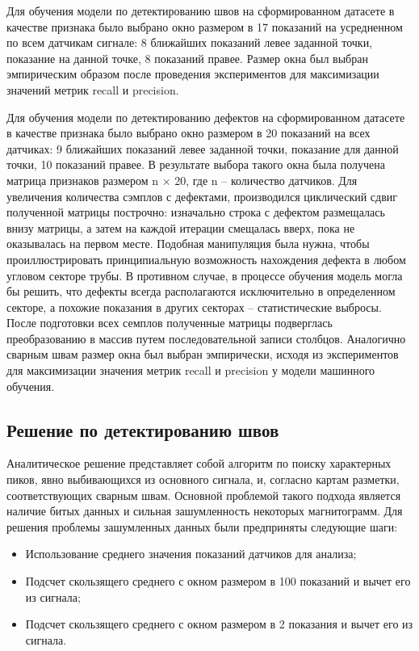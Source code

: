 \documentclass[a4paper,article,14pt]{extarticle}
\begin{document}
Для обучения модели по детектированию швов на сформированном датасете в качестве признака 
было выбрано окно размером в 17 показаний на усредненном по всем датчикам сигнале: 
8 ближайших показаний левее заданной точки, показание на данной точке, 8 показаний правее. 
Размер окна был выбран эмпирическим образом после проведения экспериментов для максимизации значений 
метрик recall и precision.

Для обучения модели по детектированию дефектов на сформированном датасете в качестве признака 
было выбрано окно размером в 20 показаний на всех датчиках: 9 ближайших показаний левее заданной точки, 
показание для данной точки, 10 показаний правее. В результате выбора такого окна была получена матрица 
признаков размером n × 20, где n – количество датчиков. Для увеличения количества сэмплов с дефектами, 
производился циклический сдвиг полученной матрицы построчно: изначально строка с дефектом размещалась \flqq внизу\frqq 
матрицы, а затем на каждой итерации смещалась \flqq вверх\frqq, пока не оказывалась на первом месте. Подобная манипуляция 
была нужна, чтобы проиллюстрировать принципиальную возможность нахождения дефекта в любом угловом секторе трубы. 
В противном случае, в процессе обучения модель могла бы решить, что дефекты всегда располагаются исключительно 
в определенном секторе, а похожие показания в других секторах – статистические выбросы. После подготовки всех 
семплов полученные матрицы подверглась преобразованию в массив путем последовательной записи столбцов. 
Аналогично сварным швам размер окна был выбран эмпирически, исходя из экспериментов для максимизации значения 
метрик recall и precision у модели машинного обучения.

\subsection{Решение по детектированию швов}

Аналитическое решение представляет собой алгоритм по поиску характерных пиков, явно выбивающихся из основного сигнала, 
и, согласно картам разметки, соответствующих сварным швам. Основной проблемой такого подхода является наличие битых 
данных и сильная зашумленность некоторых магнитограмм. Для решения проблемы зашумленных данных были предприняты 
следующие шаги: 

\begin{itemize}
    \item Использование среднего значения показаний датчиков для анализа;
    \item Подсчет скользящего среднего с окном размером в 100 показаний и вычет его из сигнала;
    \item Подсчет скользящего среднего с окном размером в 2 показания и вычет его из сигнала. 
\end{itemize}
\end{document}
